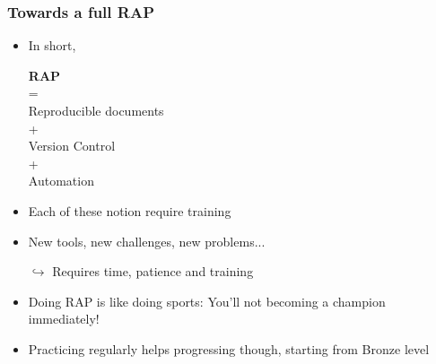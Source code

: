 \documentclass[xcolor=x11names,compress]{beamer}
\renewcommand{\(}{\begin{columns}}
\renewcommand{\)}{\end{columns}}
\newcommand{\<}[1]{\begin{column}{#1}}
\renewcommand{\>}{\end{column}}
\begin{document}
\begin{frame}
\frametitle{Towards a full RAP}

 \begin{itemize}[<+->]
        \item In short,\\
        \begin{center} \textbf{RAP}\\ =\\ Reproducible documents\\+ \\ Version Control \\+ \\ Automation \\  \end{center}
        \item Each of these notion require training
        \item New tools, new challenges, new problems...
        \item[$\hookrightarrow$]  Requires time, patience and training
        \item Doing RAP is like doing sports: You'll not becoming a champion immediately!
        \item Practicing regularly helps progressing though,  starting from Bronze level
    \end{itemize}
\end{frame}
\end{document}

